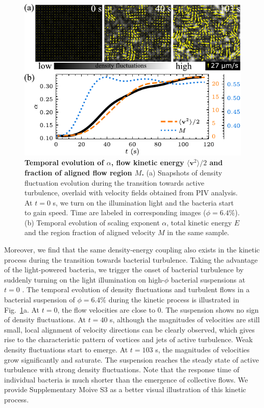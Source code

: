 \begin{figure}[!ht]
\begin{center}
\includegraphics[width=4.5in]{figs/5-GNF/7.pdf}
\caption[Temporal Evolution of $\alpha$, Flow Kinetic Energy $\langle \bm{v}^2 \rangle/2$ and Fraction of Aligned Flow Region $M$]
{
\textbf{Temporal evolution of $\alpha$, flow kinetic energy $\langle \bm{v}^2 \rangle/2$ and fraction of aligned flow region $M$.}
(a) Snapshots of density fluctuation evolution during the transition towards active turbulence, overlaid with velocity fields obtained from PIV analysis. At $t=0$ s, we turn on the illumination light and the bacteria start to gain speed. Time are labeled in corresponding images ($\phi=6.4\%$).
(b) Temporal evolution of scaling exponent $\alpha$, total kinetic energy $E$ and the region fraction of aligned velocity $M$ in the same sample.
}
\label{fig:alpha-kinetics}
\end{center}
\end{figure}


Moreover, we find that the same density-energy coupling also exists in the kinetic process during the transition towards bacterial turbulence. Taking the advantage of the light-powered bacteria, we trigger the onset of bacterial turbulence by suddenly turning on the light illumination on high-$\phi$ bacterial suspensions at $t=0$ \cite{Peng2020}.
The temporal evolution of density fluctuations and turbulent flows in a bacterial suspension of $\phi = 6.4\%$ during the kinetic process is illustrated in Fig.~\ref{fig:alpha-kinetics}a. At $t=0$, the flow velocities are close to 0. The suspension shows no sign of density fluctuations. At $t=40$ s, although the magnitudes of velocities are still small, local alignment of velocity directions can be clearly observed, which gives rise to the characteristic pattern of vortices and jets of active turbulence. Weak density fluctuations start to emerge. At $t=103$ s, the magnitudes of velocities grow significantly and saturate. The suspension reaches the steady state of active turbulence with strong density fluctuations. Note that the response time of individual bacteria is much shorter than the emergence of collective flows. We provide Supplementary Moive S3 \cite{suppMovies} as a better visual illustration of this kinetic process.

